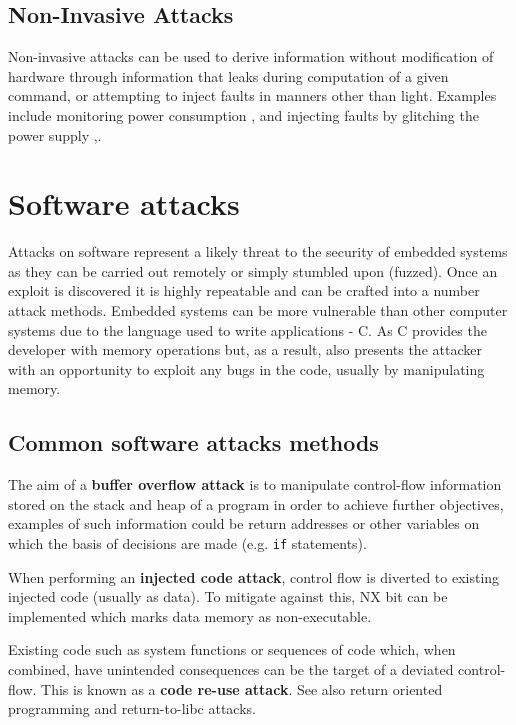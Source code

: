 \subsection{Non-Invasive Attacks}
Non-invasive attacks can be used to derive information without modification of hardware through information that leaks during computation of a given command, or attempting to inject faults in manners other than light. Examples include monitoring power consumption \cite{Maurer1999},\cite{MangardStefan2007Paa:} and injecting faults by glitching the power supply \cite{Anderson1996},\cite{Bar-el2006}.

\section{Software attacks}

Attacks on software represent a likely threat to the security of embedded systems as they can be carried out remotely or simply stumbled upon (fuzzed). Once an exploit is discovered it is highly repeatable and can be crafted into a number attack methods. Embedded systems can be more vulnerable than other computer systems due to the language used to write applications - C. As C provides the developer with memory operations but, as a result, also presents the attacker with an opportunity to exploit any bugs in the code, usually by manipulating memory.

\subsection{Common software attacks methods}

The aim of a \textbf{buffer overflow attack} is to manipulate control-flow information stored on the stack and heap of a program in order to achieve further objectives, examples of such information could be return addresses or other variables on which the basis of decisions are made (e.g. \verb|if| statements).

When performing an \textbf{injected code attack}, control flow is diverted to existing injected code (usually as data). To mitigate against this, NX bit can be implemented which marks data memory as non-executable.

Existing code such as system functions or sequences of code which, when combined, have unintended consequences can be the target of a deviated control-flow. This is known as a \textbf{code re-use attack}. See also return oriented programming and return-to-libc attacks.

